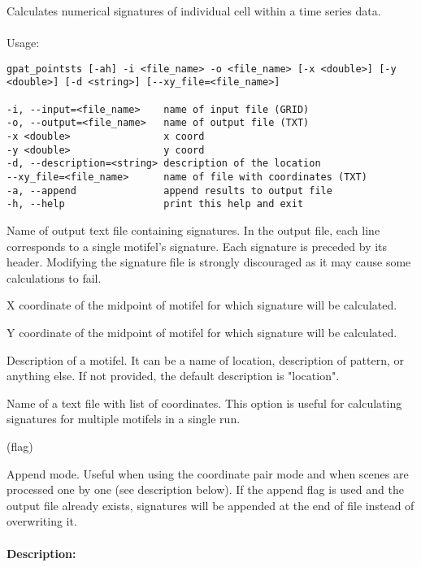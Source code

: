 Calculates numerical signatures of individual cell within a time series data.
\\\\
Usage:

\begin{minipage}{\linewidth}
\begin{lstlisting}
gpat_pointsts [-ah] -i <file_name> -o <file_name> [-x <double>] [-y <double>] [-d <string>] [--xy_file=<file_name>]

-i, --input=<file_name>    name of input file (GRID)
-o, --output=<file_name>   name of output file (TXT)
-x <double>                x coord
-y <double>                y coord
-d, --description=<string> description of the location
--xy_file=<file_name>      name of file with coordinates (TXT)
-a, --append               append results to output file
-h, --help                 print this help and exit
\end{lstlisting}
\end{minipage}



Name of output text file containing signatures.
In the output file, each line corresponds to a single motifel’s signature. 
Each signature is preceded by its header. 
Modifying the signature file is strongly discouraged as it may cause some calculations to fail.


X coordinate of the midpoint of motifel for which signature will be calculated.


Y coordinate of the midpoint of motifel for which signature will be calculated.


Description of a motifel.
It can be a name of location, description of pattern, or anything else. 
If not provided, the default description is "location".


Name of a text file with list of coordinates. 
This option is useful for calculating signatures for multiple motifels in a single run. 

 (flag)

Append mode. 
Useful when using the coordinate pair mode and when scenes are processed one by one (see description below). 
If the append flag is used and the output file already exists, signatures will be appended at the end of file instead of overwriting it.
\\\\
{\bf Description:}


